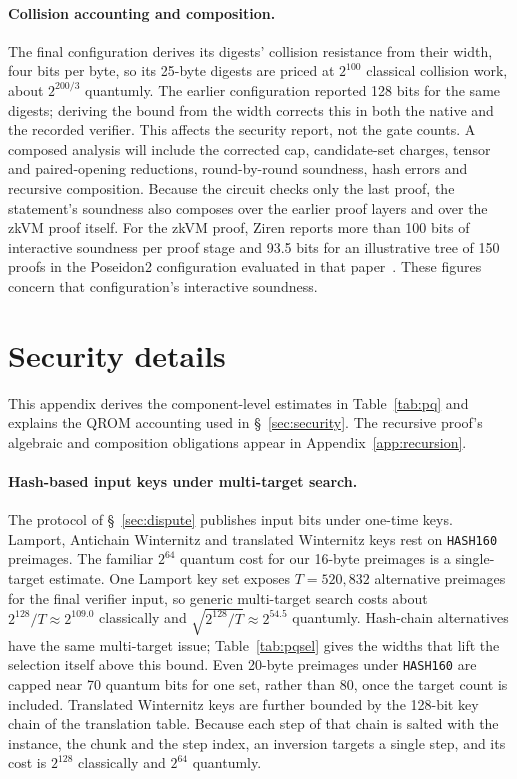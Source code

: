 \documentclass[11pt]{article}
\begin{document}
\paragraph{Collision accounting and composition.}
The final configuration derives its digests' collision resistance from
their width, four bits per byte, so its 25-byte digests are
priced at $2^{100}$ classical collision work, about $2^{200/3}$ quantumly.
The earlier configuration reported 128 bits for the same digests; deriving
the bound from the width corrects this in both the native and the recorded
verifier. This affects the security report, not the gate counts. A composed analysis will
include the corrected cap, candidate-set charges, tensor and paired-opening
reductions, round-by-round soundness, hash errors and recursive composition.
Because the circuit checks only the last proof, the
statement's soundness also composes over the earlier proof layers and over the zkVM
proof itself. For the zkVM proof, Ziren reports more than 100 bits of
interactive soundness per proof stage and 93.5 bits for an illustrative tree of
150 proofs in the Poseidon2 configuration evaluated in that
paper~\cite{duan26ziren}. These figures concern that configuration's
interactive soundness.

\section{Security details}\label{app:security}

This appendix derives the component-level estimates in Table~\ref{tab:pq}
and explains the QROM accounting used in \S~\ref{sec:security}. The recursive
proof's algebraic and composition obligations appear in Appendix~\ref{app:recursion}.

\paragraph{Hash-based input keys under multi-target search.} The protocol
of \S~\ref{sec:dispute} publishes input bits under one-time keys. Lamport, Antichain Winternitz and
translated Winternitz keys rest on \texttt{HASH160} preimages. The familiar $2^{64}$ quantum cost for our
16-byte preimages is a single-target estimate. One Lamport key set exposes
$T=520{,}832$ alternative preimages for the final verifier input, so generic
multi-target search costs about $2^{128}/T\approx2^{109.0}$ classically and
$\sqrt{2^{128}/T}\approx2^{54.5}$ quantumly. Hash-chain alternatives have the
same multi-target issue; Table~\ref{tab:pqsel} gives the widths that lift the
selection itself above this bound. Even 20-byte preimages under \texttt{HASH160} are
capped near 70 quantum bits for one set, rather than 80, once the target count
is included. Translated Winternitz keys are further bounded by the 128-bit key
chain of the translation table. Because each step of that chain is salted with
the instance, the chunk and the step index, an inversion targets a single step,
and its cost is $2^{128}$ classically and $2^{64}$ quantumly.
\end{document}
